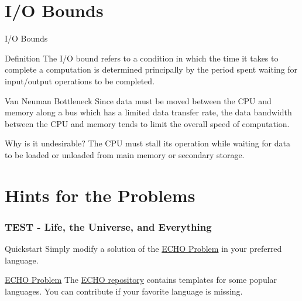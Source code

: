 \documentclass{beamer}
\begin{document}


\section{I/O Bounds}

\begin{frame}{I/O Bounds}

  \begin{block}{Definition}
    The I/O bound refers to a condition in which the time it takes to complete a computation is determined principally by the period spent waiting for input/output operations to be completed.
  \end{block}

  \begin{block}{Van Neuman Bottleneck}
    Since data must be moved between the CPU and memory along a bus which has a limited data transfer rate, the data bandwidth between the CPU and memory tends to limit the overall speed of computation.
  \end{block}

  \begin{block}{Why is it undesirable?}
    The CPU must stall its operation while waiting for data to be loaded or unloaded from main memory or secondary storage.
  \end{block}
  
\end{frame}


\section{Hints for the Problems}

\begin{frame}
  \frametitle{TEST - Life, the Universe, and Everything}

  \begin{alertblock}{Quickstart}
    Simply modify a solution of the \href{https://github.com/arnaud-m/echo}{ECHO Problem} in your preferred language.
  \end{alertblock}
  
  \begin{block}{\href{https://github.com/arnaud-m/echo}{ECHO Problem}}
    The \href{https://github.com/arnaud-m/echo}{ECHO repository} contains templates for some popular languages. You can contribute if your favorite language is missing.
  \end{block}
\end{frame}
\end{document}
